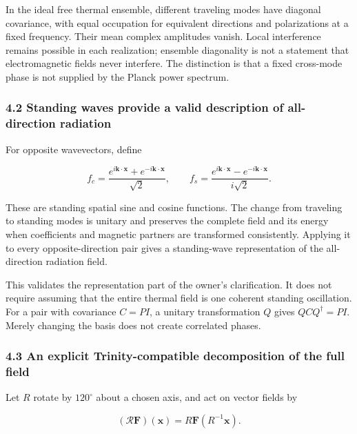 \documentclass[
  11pt,
]{article}
\begin{document}
In the ideal free thermal ensemble, different traveling modes have
diagonal covariance, with equal occupation for equivalent directions and
polarizations at a fixed frequency. Their mean complex amplitudes
vanish. Local interference remains possible in each realization;
ensemble diagonality is not a statement that electromagnetic fields
never interfere. The distinction is that a fixed cross-mode phase is not
supplied by the Planck power spectrum.

\hypertarget{standing-waves-provide-a-valid-description-of-all-direction-radiation}{%
\subsubsection{4.2 Standing waves provide a valid description of
all-direction
radiation}\label{standing-waves-provide-a-valid-description-of-all-direction-radiation}}

For opposite wavevectors, define

\[
f_c=\frac{e^{i\mathbf k\cdot\mathbf x}+e^{-i\mathbf k\cdot\mathbf x}}{\sqrt2},
\qquad
f_s=\frac{e^{i\mathbf k\cdot\mathbf x}-e^{-i\mathbf k\cdot\mathbf x}}{i\sqrt2}.
\]

These are standing spatial sine and cosine functions. The change from
traveling to standing modes is unitary and preserves the complete field
and its energy when coefficients and magnetic partners are transformed
consistently. Applying it to every opposite-direction pair gives a
standing-wave representation of the all-direction radiation field.

This validates the representation part of the owner's clarification. It
does not require assuming that the entire thermal field is one coherent
standing oscillation. For a pair with covariance \(C=P I\), a unitary
transformation \(Q\) gives \(QCQ^\dagger=P I\). Merely changing the
basis does not create correlated phases.

\hypertarget{an-explicit-trinity-compatible-decomposition-of-the-full-field}{%
\subsubsection{4.3 An explicit Trinity-compatible decomposition of the
full
field}\label{an-explicit-trinity-compatible-decomposition-of-the-full-field}}

Let \(R\) rotate by \(120^\circ\) about a chosen axis, and act on vector
fields by

\[
(\mathcal R\mathbf F)(\mathbf x)=R\mathbf F(R^{-1}\mathbf x).
\]
\end{document}
